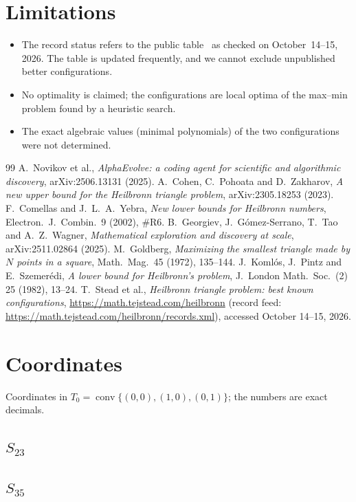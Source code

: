 \documentclass[11pt]{article}
\theoremstyle{definition}
\theoremstyle{remark}
\begin{document}
\section{Limitations}
\begin{itemize}
\item The record status refers to the public table~\cite{site} as checked on October~14--15, 2026.
The table is updated frequently, and we cannot exclude unpublished better configurations.
\item No optimality is claimed; the configurations are local optima of the max--min problem found
by a heuristic search.
\item The exact algebraic values (minimal polynomials) of the two configurations were not determined.
\end{itemize}

\begin{thebibliography}{99}
 A.~Novikov et al., \emph{AlphaEvolve: a coding agent for scientific and
algorithmic discovery}, arXiv:2506.13131 (2025).
 A.~Cohen, C.~Pohoata and D.~Zakharov, \emph{A new upper bound for the Heilbronn
triangle problem}, arXiv:2305.18253 (2023).
 F.~Comellas and J.~L.~A.~Yebra, \emph{New lower bounds for Heilbronn
numbers}, Electron.\ J.\ Combin.\ 9 (2002), \#R6.
 B.~Georgiev, J.~G\'omez-Serrano, T.~Tao and A.~Z.~Wagner, \emph{Mathematical
exploration and discovery at scale}, arXiv:2511.02864 (2025).
 M.~Goldberg, \emph{Maximizing the smallest triangle made by $N$ points in a
square}, Math.\ Mag.\ 45 (1972), 135--144.
 J.~Koml\'os, J.~Pintz and E.~Szemer\'edi, \emph{A lower bound for Heilbronn's
problem}, J.\ London Math.\ Soc.\ (2) 25 (1982), 13--24.
 T.~Stead et al., \emph{Heilbronn triangle problem: best known configurations},
\url{https://math.tejstead.com/heilbronn} (record feed:
\url{https://math.tejstead.com/heilbronn/records.xml}), accessed October 14--15, 2026.
\end{thebibliography}

\appendix
\section{Coordinates}\label{app:coords}
Coordinates in $T_0=\operatorname{conv}\{(0,0),(1,0),(0,1)\}$; the numbers are exact decimals.
\subsection*{$S_{23}$}

\subsection*{$S_{35}$}

\end{document}

